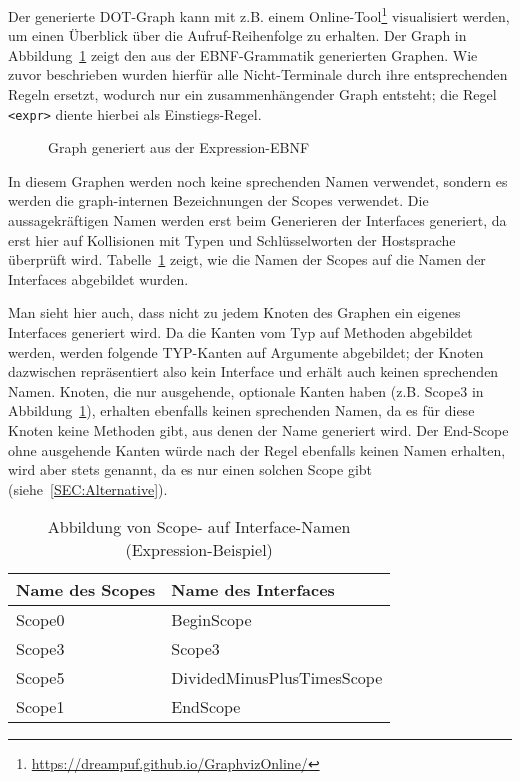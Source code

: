 \documentclass[../InterneDSLs.tex]{subfiles}
\begin{document}
Der generierte DOT-Graph kann mit z.B. einem Online-Tool\footnote{\url{https://dreampuf.github.io/GraphvizOnline/}} visualisiert werden, um einen Überblick über die Aufruf-Reihenfolge zu erhalten. Der Graph in Abbildung~\ref{FIG:ExprGraph} zeigt den aus der EBNF-Grammatik generierten Graphen. Wie zuvor beschrieben wurden hierfür alle Nicht-Terminale durch ihre entsprechenden Regeln ersetzt, wodurch nur ein zusammenhängender Graph entsteht; die Regel \verb|<expr>| diente hierbei als Einstiegs-Regel.

\begin{figure}[ht]
\centering
\resizebox{\linewidth}{!}{}
\caption{Graph generiert aus der Expression-EBNF}
\label{FIG:ExprGraph}
\end{figure}

In diesem Graphen werden noch keine sprechenden Namen verwendet, sondern es werden die graph-internen Bezeichnungen der Scopes verwendet. Die aussagekräftigen Namen werden erst beim Generieren der Interfaces generiert, da erst hier auf Kollisionen mit Typen und Schlüsselworten der Hostsprache überprüft wird. Tabelle~\ref{TAB:MappingExpressionScopeToInterface} zeigt, wie die Namen der Scopes auf die Namen der Interfaces abgebildet wurden.

Man sieht hier auch, dass nicht zu jedem Knoten des Graphen ein eigenes Interfaces generiert wird. Da die Kanten vom Typ  auf Methoden abgebildet werden, werden folgende TYP-Kanten auf Argumente abgebildet; der Knoten dazwischen repräsentiert also kein Interface und erhält auch keinen sprechenden Namen. Knoten, die nur ausgehende, optionale Kanten haben (z.B. Scope3 in Abbildung~\ref{FIG:ExprGraph}), erhalten ebenfalls keinen sprechenden Namen, da es für diese Knoten keine Methoden gibt, aus denen der Name generiert wird. Der End-Scope ohne ausgehende Kanten würde nach der Regel ebenfalls keinen Namen erhalten, wird aber stets  genannt, da es nur einen solchen Scope gibt (siehe~\ref{SEC:Alternative}).

\begin{table}[ht]
\centering
\begin{tabular}{ll}
\textbf{Name des Scopes} & \textbf{Name des Interfaces}\\\hline
Scope0 & BeginScope\\
Scope3 & Scope3\\
Scope5 & DividedMinusPlusTimesScope\\
Scope1 & EndScope\\
\end{tabular}
\caption[Abbildung von Scope- auf Interfacenamen (Expression-Beispiel)]{Abbildung von Scope- auf Interface-Namen (Expression-Beispiel)}
\label{TAB:MappingExpressionScopeToInterface}
\end{table}
\end{document}
